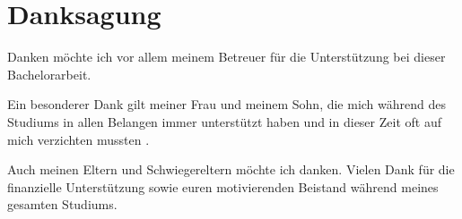 \chapter*{Danksagung}
\thispagestyle{plain}
\pagestyle{plain}

Danken möchte ich vor allem meinem Betreuer für die Unterstützung bei dieser\\ Bachelorarbeit. 

Ein besonderer Dank gilt meiner Frau und meinem Sohn, die mich während des Studiums in allen Belangen immer unterstützt haben und in dieser Zeit oft auf mich verzichten mussten .

Auch meinen Eltern und Schwiegereltern möchte ich danken.  
Vielen Dank für die \\ finanzielle Unterstützung sowie euren motivierenden Beistand während meines gesamten Studiums.































